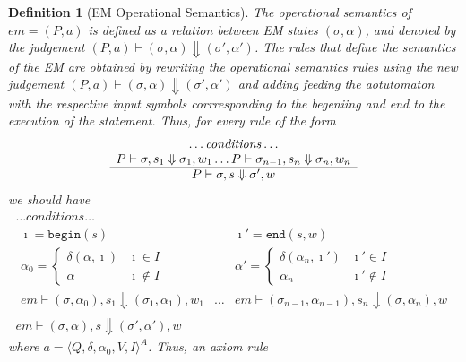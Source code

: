 \documentclass[10pt,notitlepage,twoside]{article}
\newcommand{\aut}{a}
\newcommand{\automata}[5]{\langle #1,#2,#3,#4,#5 \rangle^A}
\newcommand{\qu}{\alpha}
\newcommand{\theautomaton}{\automata{Q}{\delta}{\qu_0}{V}{I}}
\newcommand{\emdef}[2]{(#1,#2)}
\newcommand{\eval}[2]{P \vdash #1 \Downarrow #2}
\newtheorem{definition}{Definition}
\begin{document}
\begin{definition}[EM Operational Semantics]
The operational semantics of $em = \emdef{P}{\aut}$ is defined as a relation between EM states $(\sigma,\qu)$, and denoted by the judgement $\emdef{P}{\aut} \vdash (\sigma,\qu) \Downarrow (\sigma',\qu')$.
The rules that define the semantics of the EM are obtained by rewriting the operational semantics rules using the new judgement $\emdef{P}{\aut} \vdash (\sigma,\qu) \Downarrow (\sigma',\qu')$ and adding feeding the aotutomaton with the respective input symbols corrresponding to the begeniing and end to the execution of the statement. Thus, for every rule of the form
\begin{displaymath}
\begin{array}{c}
\ldots \mathit{conditions} \ldots \\
\eval{\sigma,s_1}{\sigma_1,w_1} \ldots 
\eval{\sigma_{n-1},s_n}{\sigma_n,w_n} \\
\hline
\eval{\sigma,s}{\sigma',w}
\end{array} \\
\end{displaymath}
we should have
\begin{displaymath}
\begin{array}{c}
\ldots \mathit{conditions} \ldots \\
\begin{array}{ccc}
\imath = \texttt{begin}(s) & & \imath' = \texttt{end}(s,w) \\
\qu_0 = \left \{ \begin{array}{ll}
\delta(\qu,\imath) & \imath \in I \\
\qu & \imath \not\in I
\end{array} \right . 
& & 
\qu' = \left \{ \begin{array}{ll} 
\delta(\qu_n,\imath') & \imath' \in I \\
\qu_n & \imath' \not\in I
\end{array} \right . 
\\
em \vdash (\sigma,\qu_0),s_1 \Downarrow (\sigma_1,\qu_1),w_1 & \ldots & em \vdash (\sigma_{n-1},\qu_{n-1}),s_n \Downarrow (\sigma,\qu_n),w 
\end{array} \\
\hline
em \vdash (\sigma,\qu),s \Downarrow (\sigma',\qu'),w
\end{array}
\end{displaymath}
where $\aut = \theautomaton$. Thus, an axiom rule 
\begin{displaymath}
\begin{array}{c}

\end{array}
\end{displaymath}
\end{definition}
\end{document}
